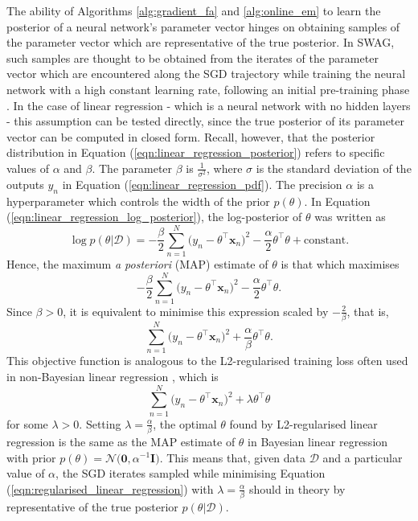 \documentclass[msc,deptreport.inf]{infthesis} %
\newcommand{\matr}[1]{\mathbf{#1}}
\begin{document}
The ability of Algorithms \ref{alg:gradient_fa} and \ref{alg:online_em} to learn the posterior of a neural network's parameter vector hinges on obtaining samples of the parameter vector which are representative of the true posterior. In SWAG, such samples are thought to be obtained from the iterates of the parameter vector which are encountered along the SGD trajectory while training the neural network with a high constant learning rate, following an initial pre-training phase \cite{maddox2019}. In the case of linear regression - which is a neural network with no hidden layers - this assumption can be tested directly, since the true posterior of its parameter vector can be computed in closed form. Recall, however, that the posterior distribution in Equation (\ref{eqn:linear_regression_posterior}) refers to specific values of $\alpha$ and $\beta$. The parameter $\beta$ is $\frac{1}{\sigma^2}$, where $\sigma$ is the standard deviation of the outputs $y_n$ in Equation (\ref{eqn:linear_regression_pdf}). The precision $\alpha$ is a hyperparameter which controls the width of the prior $p(\theta)$. In Equation (\ref{eqn:linear_regression_log_posterior}), the log-posterior of $\theta$ was written as 
\begin{equation}
	\log p(\theta | \mathcal{D}) 
	= -\frac{\beta}{2} \sum_{n=1}^N \big(y_n - \theta^\intercal \matr{x}_n \big)^2 
	-\frac{\alpha}{2} \theta^\intercal \theta 
	+ \text{constant}.
\end{equation}
Hence, the maximum \emph{a posteriori} (MAP) estimate of $\theta$ is that which maximises
\begin{equation}
	-\frac{\beta}{2} \sum_{n=1}^N \big(y_n - \theta^\intercal \matr{x}_n \big)^2 
	-\frac{\alpha}{2} \theta^\intercal \theta.
\end{equation}
Since $\beta > 0$, it is equivalent to minimise this expression scaled by $-\frac{2}{\beta}$, that is,
\begin{equation}
	\sum_{n=1}^N \big(y_n - \theta^\intercal \matr{x}_n \big)^2 
	+ \frac{\alpha}{\beta} \theta^\intercal \theta.
\end{equation}
This objective function is analogous to the L2-regularised training loss often used in non-Bayesian linear regression \cite{barber2007}, which is 
\begin{equation}\label{eqn:regularised_linear_regression}
	\sum_{n=1}^N \big(y_n - \theta^\intercal \matr{x}_n \big)^2 
	+ \lambda \theta^\intercal \theta 
\end{equation}
for some $\lambda > 0$. Setting $\lambda = \frac{\alpha}{\beta}$, the optimal $\theta$ found by L2-regularised linear regression is the same as the MAP estimate of $\theta$ in Bayesian linear regression with prior $p(\theta) = \mathcal{N}\big(\matr{0}, \alpha^{-1} \matr{I} \big)$. This means that, given data $\mathcal{D}$ and a particular value of $\alpha$, the SGD iterates sampled while minimising Equation (\ref{eqn:regularised_linear_regression}) with $\lambda = \frac{\alpha}{\beta}$ should in theory by representative of the true posterior $p(\theta | \mathcal{D})$.
 
\end{document}
